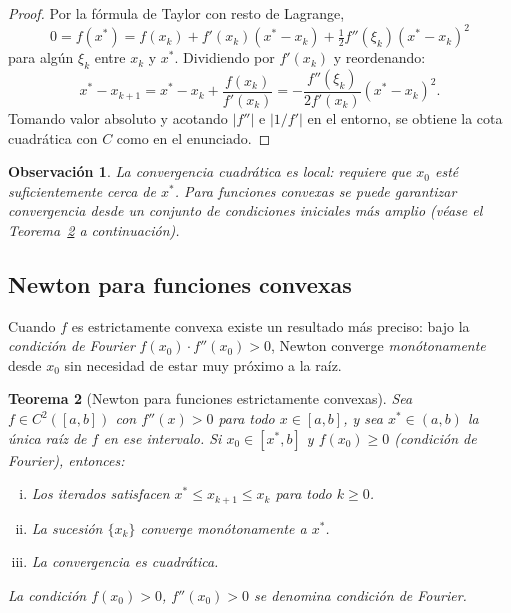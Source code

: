 \documentclass[a4paper,11pt]{report}
\newtheorem{theorem}{Teorema}[chapter]
\newtheorem{remark}[theorem]{Observación}
\begin{document}
\begin{proof}
Por la fórmula de Taylor con resto de Lagrange,
\[
0=f(x^*)=f(x_k)+f'(x_k)(x^*-x_k)+\tfrac12 f''(\xi_k)(x^*-x_k)^2
\]
para algún $\xi_k$ entre $x_k$ y $x^*$.  Dividiendo por $f'(x_k)$ y reordenando:
\[
x^*-x_{k+1}=x^*-x_k+\frac{f(x_k)}{f'(x_k)}
=-\frac{f''(\xi_k)}{2f'(x_k)}(x^*-x_k)^2.
\]
Tomando valor absoluto y acotando $|f''|$ e $|1/f'|$ en el entorno,
se obtiene la cota cuadrática con $C$ como en el enunciado.
\end{proof}

\begin{remark}
La convergencia cuadrática es local: requiere que $x_0$ esté suficientemente
cerca de $x^*$.  Para funciones convexas se puede garantizar convergencia
desde un conjunto de condiciones iniciales más amplio
(véase el Teorema~\ref{thm:newton_convex} a continuación).
\end{remark}

\subsection{Newton para funciones convexas}
\label{subsec:newton_convex}

Cuando $f$ es estrictamente convexa existe un resultado
más preciso: bajo la \emph{condición de Fourier}
$f(x_0)\cdot f''(x_0)>0$, Newton converge \emph{monótonamente} desde $x_0$
sin necesidad de estar muy próximo a la raíz.

\begin{theorem}[Newton para funciones estrictamente convexas]\label{thm:newton_convex}
Sea $f\in C^2([a,b])$ con $f''(x)>0$ para todo $x\in[a,b]$,
y sea $x^*\in(a,b)$ la única raíz de $f$ en ese intervalo.
Si $x_0\in[x^*,b]$ y $f(x_0)\ge 0$ (condición de Fourier), entonces:
\begin{enumerate}[(i)]
\item Los iterados satisfacen $x^*\le x_{k+1}\le x_k$ para todo $k\ge 0$.
\item La sucesión $\{x_k\}$ converge monótonamente a $x^*$.
\item La convergencia es cuadrática.
\end{enumerate}
La condición $f(x_0)>0$, $f''(x_0)>0$ se denomina \emph{condición de Fourier}.
\end{theorem}
\end{document}
